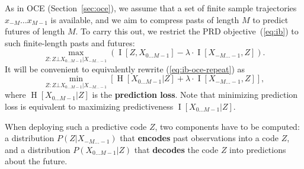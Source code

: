 \documentclass[entropy,article,submit,moreauthors,pdftex,10pt,a4paper]{Definitions/mdpi}
\newif \ifcomment
\newcommand\rljf[1]{\ifcomment{{\color{blue}(#1)}}\else{}\fi}
\newcommand{\past}{\overleftarrow{X}}
\newcommand{\key}{\textbf}
\newcommand{\finitefuture}{X_{0\dots M-1}}
\begin{document}
As in OCE (Section~\ref{sec:oce}), we assume that a set of finite sample trajectories $x_{-M} \dots x_{M-1}$ is available, and we aim to compress pasts of length $M$ to predict futures of length $M$. To carry this out, we restrict the PRD objective~(\ref{eq:ib}) to such finite-length pasts and futures: \rljf{I think it would be a lot clearer to use the notation from other papers where it's like $\past$ except the arrow points to $M$. It's hard visually looking at the equations to distinguish $-M\dots-1$ from $0\dots M-1$, and that makes it harder to read.}
\begin{equation}\label{eq:ib-oce-repeat}
	\max_{Z : Z \bot \finitefuture | X_{-M\dots-1}} \left( \operatorname{I}[Z, \finitefuture] - \lambda \cdot \operatorname{I}[X_{-M\dots -1}, Z] \right).
\end{equation}
It will be convenient to equivalently rewrite (\ref{eq:ib-oce-repeat}) as
\begin{equation}\label{eq:prd-loss}
	\min_{Z : Z \bot \finitefuture | X_{-M\dots-1}}	\left[\operatorname{H}[\finitefuture | Z] + \lambda \cdot\operatorname{I}[ X_{-M\dots-1}, Z]\right],
\end{equation}
where $\operatorname{H}[\finitefuture | Z]$ is the \key{prediction loss}. Note that minimizing prediction loss is equivalent to maximizing predictiveness $\operatorname{I}[\finitefuture | Z]$. %


When deploying such a predictive code $Z$, two components have to be computed: a distribution $P(Z|X_{-M\dots -1})$ that \key{encodes} past observations into a code $Z$, and a distribution $P(\finitefuture|Z)$ that \key{decodes} the code $Z$ into predictions about the future.
\end{document}
